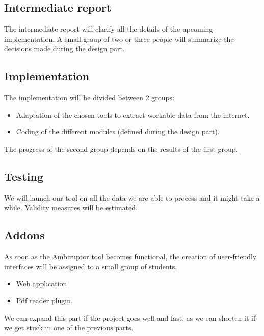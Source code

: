 \documentclass[11pt,a4paper]{article}
\begin{document}
\subsection{Intermediate report}

The intermediate report will clarify all the details of the upcoming implementation. A small group of two or three people will summarize the decisions made during the design part.

\subsection{Implementation}

The implementation will be divided between 2 groups:
\begin{itemize}
	\item Adaptation of the chosen tools to extract workable data from the internet.
	\item Coding of the different modules (defined during the design part).
\end{itemize}
The progress of the second group depends on the results of the first group.


\subsection{Testing}

We will launch our tool on all the data we are able to process and it might take a while. Validity measures will be estimated.

\subsection{Addons}

As soon as the Ambiruptor tool becomes functional, the creation of user-friendly interfaces will be assigned to a small group of students.
\begin{itemize}
	\item Web application.
	\item Pdf reader plugin.
\end{itemize}
We can expand this part if the project goes well and fast, as we can shorten it if we get stuck in one of the previous parts.

\end{document}
